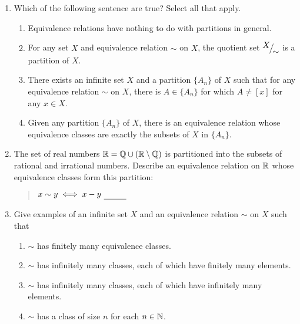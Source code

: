 \begin{enumerate}
	\item Which of the following sentence are true? Select all that apply.
	\begin{enumerate}
    \item Equivalence relations have nothing to do with partitions in general.
    \item For any set $X$ and equivalence relation $\sim$ on $X$, the quotient set ${}^{\textstyle {X}}\!\big/_{\textstyle \!{\sim}}$ is a partition of $X$.
    \item There exists an infinite set $X$ and a partition $\{A_n\}$ of $X$ such that for any equivalence relation $\sim$ on $X$, there is $A \in \{A_n\}$ for which $A \neq [x]$ for any $x \in X$.
    \item Given any partition $\{A_n\}$ of $X$, there is an equivalence relation whose equivalence classes are exactly the subsets of $X$ in $\{A_n\}$.
	\end{enumerate}
	
	
	\item The set of real numbers $\mathbb{R}=\mathbb{Q}\cup(\mathbb{R}\setminus\mathbb{Q})$ is partitioned into the subsets of rational and irrational numbers. Describe an equivalence relation on $\mathbb{R}$ whose equivalence classes form this partition:
	\begin{quote}
		$x\sim y\iff x-y\ \underline{\phantom{\in\Q\quad}}$
	\end{quote}
	
		
	
	\item Give examples of an infinite set $X$ and an equivalence relation $\sim$ on $X$ such that
	\begin{enumerate}
    \item $\sim$ has finitely many equivalence classes.
    \item $\sim$ has infinitely many classes, each of which have finitely many elements.
    \item $\sim$ has infinitely many classes, each of which have infinitely many elements.
    \item $\sim$ has a class of size $n$ for each $n \in \mathbb{N}$.
	\end{enumerate}
\end{enumerate}



